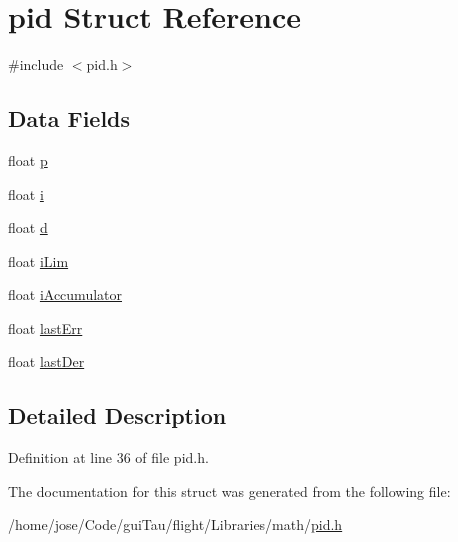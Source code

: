 \hypertarget{structpid}{\section{pid Struct Reference}
\label{structpid}
}


{\ttfamily \#include $<$pid.\-h$>$}

\subsection*{Data Fields}
\begin{DoxyCompactItemize}
\item 
float \hyperlink{group___sine_ga8281b69c68be641d7b0dcf0322b3715f}{p}
\item 
float \hyperlink{group___sine_ga97ebc09fc39d749940ebdc48926b8bb1}{i}
\item 
float \hyperlink{group___sine_ga1c4d7f2ca382af4be8d036cc36bd9c31}{d}
\item 
float \hyperlink{group___sine_ga2a3ee941dff64851693d27d04ece04f3}{i\-Lim}
\item 
float \hyperlink{group___sine_gafb7f8463c8cefe80b65db478c349a0b1}{i\-Accumulator}
\item 
float \hyperlink{group___sine_gab61187c1e1bf8e3f6b09501992bd744f}{last\-Err}
\item 
float \hyperlink{group___sine_gae79ee69d35b5daccddb71cbe270fbbd1}{last\-Der}
\end{DoxyCompactItemize}


\subsection{Detailed Description}


Definition at line 36 of file pid.\-h.



The documentation for this struct was generated from the following file\-:\begin{DoxyCompactItemize}
\item 
/home/jose/\-Code/gui\-Tau/flight/\-Libraries/math/\hyperlink{pid_8h}{pid.\-h}\end{DoxyCompactItemize}

